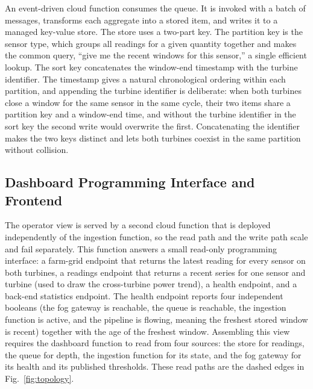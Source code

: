 \documentclass[conference]{IEEEtran}
\begin{document}
An event-driven cloud function consumes the queue. It is invoked with a batch of messages, transforms each aggregate into a stored item, and writes it to a managed key-value store. The store uses a two-part key. The partition key is the sensor type, which groups all readings for a given quantity together and makes the common query, ``give me the recent windows for this sensor,'' a single efficient lookup. The sort key concatenates the window-end timestamp with the turbine identifier. The timestamp gives a natural chronological ordering within each partition, and appending the turbine identifier is deliberate: when both turbines close a window for the same sensor in the same cycle, their two items share a partition key and a window-end time, and without the turbine identifier in the sort key the second write would overwrite the first. Concatenating the identifier makes the two keys distinct and lets both turbines coexist in the same partition without collision.

\subsection{Dashboard Programming Interface and Frontend}

The operator view is served by a second cloud function that is deployed independently of the ingestion function, so the read path and the write path scale and fail separately. This function answers a small read-only programming interface: a farm-grid endpoint that returns the latest reading for every sensor on both turbines, a readings endpoint that returns a recent series for one sensor and turbine (used to draw the cross-turbine power trend), a health endpoint, and a back-end statistics endpoint. The health endpoint reports four independent booleans (the fog gateway is reachable, the queue is reachable, the ingestion function is active, and the pipeline is flowing, meaning the freshest stored window is recent) together with the age of the freshest window. Assembling this view requires the dashboard function to read from four sources: the store for readings, the queue for depth, the ingestion function for its state, and the fog gateway for its health and its published thresholds. These read paths are the dashed edges in Fig.~\ref{fig:topology}.
\end{document}

